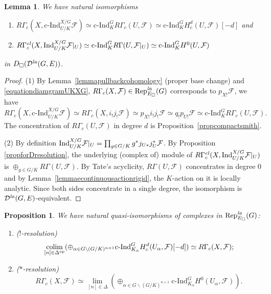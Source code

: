 \documentclass[a4paper,10pt]{amsart}
\theoremstyle{remark}
\theoremstyle{definition}
\theoremstyle{plain}
\newtheorem{lemma}[theorem]{Lemma}
\newtheorem{proposition}[theorem]{Proposition}
\numberwithin{equation}{section}
\newcommand{\calD}{{\mathcal D}}
\newcommand{\calF}{{\mathcal F}}
\newcommand{\Ind}{{\rm Ind}}
\newcommand{\la}{{\it la}}
\newcommand{\Rep}{{\rm Rep}}
\newcommand{\cInd}{\mathrm{c\text{-}Ind}}
\DeclareMathOperator{\colim}{colim}
\begin{document}
 \begin{lemma}\label{lemmacompactinduction}
	We have natural isomorphisms
	\begin{enumerate}
		\item $R\Gamma_c(X,\cInd^{X/G}_{U/K}\calF)\simeq \cInd_K^GR\Gamma_c(U,\calF)\simeq \cInd_K^GH_c^d(U,\calF)[-d]$ and 
		\item $R\Gamma_c^{\it cl}(X,\Ind_{U/K}^{X/G} \calF|_{U})\simeq \cInd_{K}^{G} R\Gamma(U,\calF|_U)\simeq \cInd_{K}^{G} H^0(U,\calF)$
	\end{enumerate}
	in $D_{\square}(\calD^{\la}(G,E))$.
\end{lemma}
\begin{proof}
	(1) By Lemma~\ref{lemmapullbackcohomology} (proper base change) and \eqref{equationdiamgramUKXG}, $R\Gamma_{c}(X,\calF)\in \Rep^{\la}_{E_\square}(G)$ corresponds to $p_{X!}\calF$, we have  $R\Gamma_c(X,\cInd^{X/G}_{U/K}\calF)\simeq R\Gamma_c(X,i_!j_!\calF)\simeq p_{X!}i_!j_!\calF\simeq q_!p_{U!}\calF\simeq \cInd_K^GR\Gamma_c(U,\calF).$ The concentration of $R\Gamma_c(U,\calF)$ in degree $d$ is Proposition~\ref{propcompactsmith}.

	(2) By definition $\Ind_{U/K}^{X/G} \calF|_{U}=\prod_{g\in G/K} g^*j_{U*}j_U^*\calF$. By Proposition \ref{propforDresolution}, the underlying (complex of) module of  $R\Gamma_c^{\it cl}(X,\Ind_{U/K}^{X/G} \calF|_{U})$ is $\oplus_{g\in G/K} R\Gamma(U,\calF)$. By Tate's acyclicity, $R\Gamma(U,\calF)$ concentrates in degree $0$ and by Lemma~\ref{lemmaecontinuousactionrigid}, the $K$-action on it is locally analytic. Since both sides concentrate in a single degree, the isomorphism is $\calD^{\la}(G,E)$-equivalent.
\end{proof}

\begin{proposition}\label{propositionresolutions}
	We have natural quasi-isomorphisms of complexes in $\Rep^{\la}_{E_\square}(G)$:
	\begin{enumerate}
		\item($!$-resolution) \begin{equation}\label{resolution}
			\colim_{[n]\in\Delta^{\rm op}} (\oplus_{\alpha\in G\backslash (G/K)^{n+1}}\cInd_{K_\alpha}^G  H_c^d(U_\alpha,\calF)[-d])\simeq R\Gamma_c(X,\calF);
		\end{equation}	
		\item ($*$-resolution)
		\begin{equation}\label{dualresolution}
			R\Gamma_c(X,\calF)\simeq \lim_{[n]\in\Delta}(\oplus_{\alpha\in G\backslash (G/K)^{n+1}} \cInd_{K_\alpha}^G H^0(U_\alpha,\calF)).
			\end{equation}
	\end{enumerate} 
\end{proposition}
\end{document}

